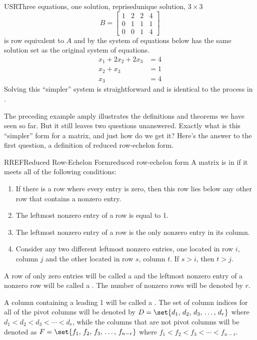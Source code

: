 \begin{example}{USR}{Three equations, one solution, reprised}{unique solution, $3\times 3$}
\begin{equation*}
B=\begin{bmatrix}
1&2&2&4\\
0&1& 1&1\\
0&0&1&4
\end{bmatrix}
\end{equation*}
is row equivalent to $A$
and by  the system of equations below has the same solution set as the original system of equations.
%
\begin{align*}
x_1+2x_2+2x_3&=4\\
x_2+ x_3&=1\\
x_3&=4
\end{align*}
Solving this ``simpler'' system is straightforward and is identical to the process in .
\end{example}
%
%
%
The preceding example amply illustrates the definitions and theorems we have seen so far.  But it still leaves two questions unanswered.  Exactly what is this ``simpler'' form for a matrix, and just how do we get it?  Here's the answer to the first question, a definition of reduced row-echelon form.
%
\begin{definition}{RREF}{Reduced Row-Echelon Form}{reduced row-echelon form}
A matrix is in  if it meets all of the following conditions:
\begin{enumerate}
\item If there is a row where every entry is zero, then this row lies below any other row that contains a nonzero entry.
\item The leftmost nonzero entry of a row is equal to 1.
\item The leftmost nonzero entry of a row is the only nonzero entry in its column.
\item Consider any two different leftmost nonzero entries, one located in row $i$, column $j$ and the other located in row $s$, column $t$.  If $s>i$, then $t>j$.
\end{enumerate}
A row of only zero entries will be called a  and the leftmost nonzero entry of a nonzero row will be called a .  The number of nonzero rows will be denoted by $r$.\par
%
A column containing a leading 1 will be called a .  The set of column indices for all of the pivot columns will be denoted by $D=\set{d_1,\,d_2,\,d_3,\,\ldots,\,d_r}$ where $d_1<d_2<d_3<\cdots<d_r$, while the columns that are not pivot columns will be denoted as $F=\set{f_1,\,f_2,\,f_3,\,\ldots,\,f_{n-r}}$ where $f_1<f_2<f_3<\cdots<f_{n-r}$.
\end{definition}
